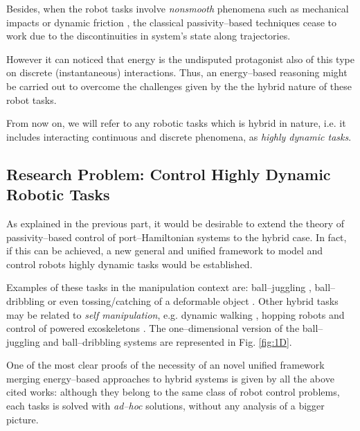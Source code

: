 %
Besides, when the robot tasks involve \textit{nonsmooth} phenomena such as mechanical impacts or dynamic friction \cite{brogliato1999nonsmooth}, the classical passivity--based techniques cease to work due to the discontinuities in system's state along trajectories. 

However it can noticed that energy is the undisputed protagonist also of this type on discrete (instantaneous) interactions. Thus, an energy--based reasoning might be carried out to overcome the challenges given by the the hybrid nature of these robot tasks.  

From now on, we will refer to any robotic tasks which is hybrid in nature, i.e. it includes interacting continuous and discrete phenomena, as \textit{highly dynamic tasks}.
\subsection{Research Problem: Control Highly Dynamic Robotic Tasks}
%
As explained in the previous part, it would be desirable to extend the theory of passivity--based control of port--Hamiltonian systems to the hybrid case. In fact, if this can be achieved, a new general and unified framework to model and control robots highly dynamic tasks would be established.
%
\newline

%
Examples of these tasks in the manipulation context are:
ball--juggling \cite{sanfelice2007hybrid, tian2013}, ball--dribbling \cite{Batz2010, haddadin2018exploiting} or even tossing/catching of a deformable object \cite{ruggero2018}. 
Other hybrid tasks may be related to \textit{self manipulation}, e.g. dynamic walking \cite{spong2007,westervelt2018feedback}, hopping robots \cite{Ishikawa2003} and control of powered exoskeletons \cite{harib2018feedback,lv2018design}. The one--dimensional version of the ball--juggling and ball--dribbling systems are represented in Fig. \ref{fig:1D}.
%
\newline

%
One of the most clear proofs of the necessity of an novel unified framework merging energy--based approaches to hybrid systems is given by all the above cited works: although they belong to the same class of robot control problems, each tasks is solved with \textit{ad--hoc} solutions, without any analysis of a bigger picture.  
%
\newline

